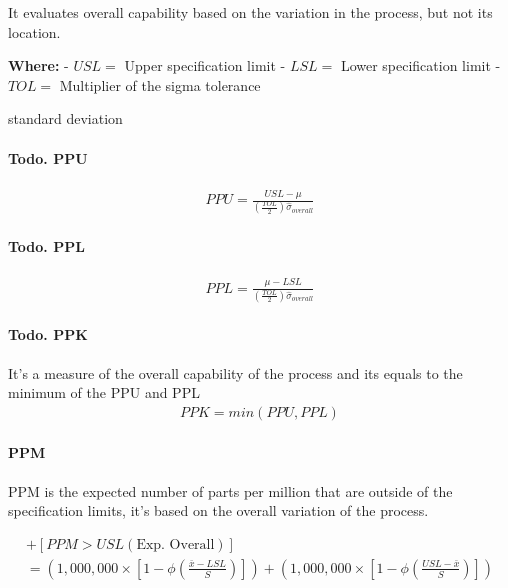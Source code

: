 \documentclass[11pt]{article}
\begin{document}
It evaluates overall capability based on the variation in the process,
but not its location.



\textbf{Where:} - \(USL =\) Upper specification limit - \(LSL =\) Lower
specification limit - \(TOL =\) Multiplier of the sigma tolerance

standard deviation

\hypertarget{todo.-ppu}{%
\paragraph{Todo. PPU}\label{todo.-ppu}}
\begin{gather}
  PPU = \frac{USL - \mu }{(\frac{TOL}{2})\hat{\sigma}_{overall}}
\end{gather}

\hypertarget{todo.-ppl}{%
\paragraph{Todo. PPL}\label{todo.-ppl}}

\begin{gather}
  PPL = \frac{\mu - LSL}{(\frac{TOL}{2})\hat{\sigma}_{overall}}
\end{gather}

\hypertarget{todo.-ppk}{%
\paragraph{Todo. PPK}\label{todo.-ppk}}

It's a measure of the overall capability of the process and its equals
to the minimum of the PPU and PPL
\begin{gather}
  PPK = min(PPU, PPL)
\end{gather}

\hypertarget{ppm}{%
\paragraph{PPM}\label{ppm}}

PPM is the expected number of parts per million that are outside of the
specification limits, it's based on the overall variation of the
process.

\begin{gather}
  [PPM < LSL(\text{Exp. Overall})] + [PPM > USL(\text{Exp. Overall})] 
  \\ = \left (1,000,000 \times \left [1 - \phi \left (\frac{\bar x - LSL}{S} \right ) \right ] \right ) + \left (1,000,000 \times \left [1 - \phi \left (\frac{USL - \bar x}{S} \right ) \right ] \right )
\end{gather}
\end{document}
